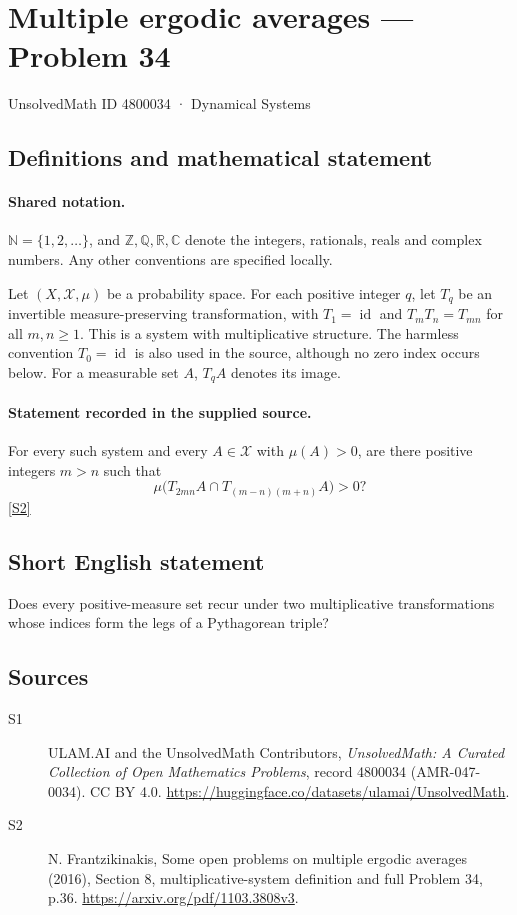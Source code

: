\documentclass[11pt]{article}
\newcommand{\sref}[2]{\hyperlink{source:#1:#2}{[S#2]}}
\begin{document}
\setcounter{section}{4800033}
\section{Multiple ergodic averages — Problem 34}\label{4800034}
{\small\sffamily UnsolvedMath ID 4800034 · Dynamical Systems}
\subsection{Definitions and mathematical statement}

\paragraph{Shared notation.}$\mathbb N=\{1,2,\ldots\}$, and $\mathbb Z,\mathbb Q,\mathbb R,\mathbb C$ denote the integers, rationals, reals and complex numbers. Any other conventions are specified locally.


Let $(X,\mathcal X,\mu)$ be a probability space. For each positive integer $q$, let $T_q$ be an invertible measure-preserving transformation, with $T_1=\operatorname{id}$ and $T_mT_n=T_{mn}$ for all $m,n\ge1$. This is a system with multiplicative structure. The harmless convention $T_0=\operatorname{id}$ is also used in the source, although no zero index occurs below. For a measurable set $A$, $T_qA$ denotes its image.
\paragraph{Statement recorded in the supplied source.}
For every such system and every $A\in\mathcal X$ with $\mu(A)>0$, are there positive integers $m>n$ such that \[\mu\bigl(T_{2mn}A\cap T_{(m-n)(m+n)}A\bigr)>0?\] \sref{4800034}{2}
\subsection{Short English statement}
Does every positive-measure set recur under two multiplicative transformations whose indices form the legs of a Pythagorean triple?
\subsection{Sources}
\begin{description}
\item[\hypertarget{source:4800034:1}{S1}] ULAM.AI and the UnsolvedMath Contributors, \emph{UnsolvedMath: A Curated Collection of Open Mathematics Problems}, record 4800034 (AMR-047-0034). CC BY 4.0. \url{https://huggingface.co/datasets/ulamai/UnsolvedMath}.
\item[\hypertarget{source:4800034:2}{S2}] N. Frantzikinakis, Some open problems on multiple ergodic averages (2016), Section 8, multiplicative-system definition and full Problem 34, p.36. \url{https://arxiv.org/pdf/1103.3808v3}.
\end{description}
\label{end:4800034}
\end{document}
